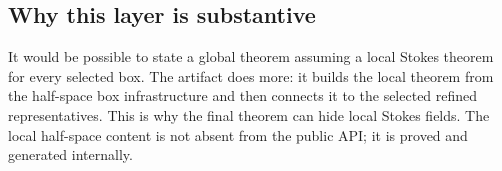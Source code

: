 \subsection{Why this layer is substantive}

It would be possible to state a global theorem assuming a local Stokes theorem
for every selected box.  The artifact does more: it builds the local theorem
from the half-space box infrastructure and then connects it to the selected
refined representatives.  This is why the final theorem can hide local Stokes
fields.  The local half-space content is not absent from the public API; it is
proved and generated internally.
